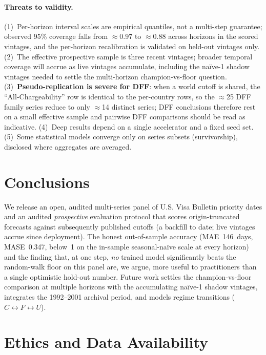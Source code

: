 \documentclass[runningheads]{llncs}
\begin{document}
\paragraph{Threats to validity.} (1)~Per-horizon interval scales are empirical
quantiles, not a multi-step guarantee; observed 95\% coverage falls from
$\approx$0.97 to $\approx$0.88 across horizons in the scored vintages, and the
per-horizon recalibration is validated on held-out vintages only. (2)~The effective
prospective sample is three recent vintages; broader temporal coverage will accrue
as live vintages accumulate, including the naïve-1 shadow vintages needed to settle
the multi-horizon champion-vs-floor question. (3)~\textbf{Pseudo-replication is
severe for DFF}: when a world cutoff is shared, the ``All-Chargeability'' row is
identical to the per-country rows, so the $\approx$25 DFF family series reduce to
only $\approx$14 distinct series; DFF conclusions therefore rest on a small
effective sample and pairwise DFF comparisons should be read as indicative.
(4)~Deep results depend on a single accelerator and a fixed seed set. (5)~Some
statistical models converge only on series subsets (survivorship), disclosed where
aggregates are averaged.

\section{Conclusions}
\label{sec:conclusions}

We release an open, audited multi-series panel of U.S. Visa Bulletin priority dates
and an audited \emph{prospective} evaluation protocol that scores
origin-truncated forecasts against subsequently published cutoffs (a backfill to
date; live vintages accrue since deployment). The honest out-of-sample accuracy
(MAE~146~days, MASE~0.347, below~1 on the in-sample seasonal-naïve scale at every
horizon) and the
finding that, at one step, \emph{no} trained model significantly beats the
random-walk floor on this panel are, we argue, more useful to practitioners than a
single optimistic hold-out number. Future work settles the champion-vs-floor
comparison at multiple horizons with the accumulating naïve-1 shadow vintages,
integrates the 1992--2001 archival period, and models regime transitions
($C\!\leftrightarrow\!F\!\leftrightarrow\!U$).

\section*{Ethics and Data Availability}
\label{sec:ethics}
\end{document}
